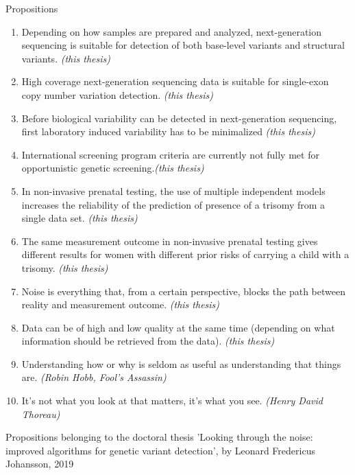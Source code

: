 \documentclass[10pt]{article}
\begin{document}
\thispagestyle{empty}

\Large
Propositions

\small

\begin{enumerate}

  \item Depending on how samples are prepared and analyzed, next-generation sequencing is suitable for detection of both base-level variants and structural variants. \textsl{(this thesis)}

  \item High coverage next-generation sequencing data is suitable for single-exon copy number variation detection. \textsl{(this thesis)}

  \item Before biological variability can be detected in next-generation sequencing, first laboratory induced variability has to be minimalized \textsl{(this thesis)}

  \item International screening program criteria  are currently not fully met for opportunistic genetic screening.\textsl{(this thesis)}

  \item In non-invasive prenatal testing, the use of multiple independent models increases the reliability of  the prediction of presence of a trisomy from a single data set. \textsl{(this thesis)}

  \item The same measurement outcome in non-invasive prenatal testing gives different results for women with different prior risks of carrying a child with a trisomy. \textsl{(this thesis)}

  \item Noise is everything that, from a certain perspective, blocks the path between reality and measurement outcome. \textsl{(this thesis)}

  \item Data can be of high and low quality at the same time (depending on what information should be retrieved from the data). \textsl{(this thesis)}

  \item Understanding how or why is seldom as useful as understanding that things are. \textsl{(Robin Hobb, Fool's Assassin)}
  
  \item It’s not what you look at that matters, it’s what you see. \textsl{(Henry David Thoreau)}
  
\end{enumerate}

\noindent
Propositions belonging to the doctoral thesis 'Looking through the noise: improved algorithms for genetic variant detection', by Leonard Fredericus Johansson, 2019
\end{document}
